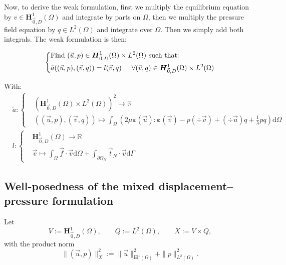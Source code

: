 \documentclass[a4paper,12pt,twoside]{report}
\newcommand{\mtr}{\mathbb{R}}
\newcommand{\dif}{\mathrm{d}}
\begin{document}
Now, to derive the weak formulation, first we multiply the equilibrium equation by $v \in \boldsymbol H^1_{\vec 0,D}(\Omega)$ and integrate by parts on $\Omega$, then we multiply the pressure field equation by $q \in L^2(\Omega)$ and integrate over $\Omega$. Then we simply add both integrals. 
The weak formulation is then: 
\begin{tcolorbox}
\begin{equation}
	\label{eq:weak_pressure_displ_form}
	\left\{
	\begin{aligned}
		&\text{Find } (\vec u,p) \in \boldsymbol H^1_{\vec 0,D}(\Omega) \times L^2(\Omega) \text{ such that:}\\
		& \tilde{a}((\vec u,p),(\vec v,q)) = l(\vec v,q) \hspace{0.5cm} \forall (\vec v,q) \in \boldsymbol H^1_{\vec 0,D}(\Omega) \times L^2(\Omega)
	\end{aligned}
	\right.
\end{equation}
\end{tcolorbox}

With: 
\begin{equation*}
	\begin{aligned}
		& \tilde{a} : \left\{
		\begin{aligned}
			&\left( \boldsymbol H^1_{\vec 0,D}(\Omega) \times L^2(\Omega) \right)^2 \rightarrow \mtr \\
			&((\vec u,p),(\vec v,q))  \longmapsto \int_\Omega \left( 2\mu \boldsymbol{\varepsilon}(\vec u) : \boldsymbol{\varepsilon}(\vec v) - p (\div \vec v) + (\div \vec u)q + \frac{1}{\lambda} pq \right) \dif \Omega
		\end{aligned}
		\right. \\
		& l : 
		\left\{
		\begin{aligned}
			&\boldsymbol H^1_{\vec 0,D}(\Omega) \rightarrow \mtr \\
			&\vec v \longmapsto \int_\Omega \vec f \cdot \vec v \dif \Omega + \int_{\partial\Omega_N} \vec t_N \cdot \vec v \dif \Gamma
		\end{aligned}
		\right.
	\end{aligned}
\end{equation*}


\subsection{Well-posedness of the mixed displacement–pressure formulation}

Let
\[
V:=\boldsymbol H^1_{\vec 0,D}(\Omega),\qquad Q:=L^2(\Omega),\qquad X:=V\times Q,
\]
with the product norm
\[
\|(\vec u,p)\|_X^2 := \|\vec u\|_{\boldsymbol H^1(\Omega)}^2 + \|p\|_{L^2(\Omega)}^2.
\]
\end{document}
